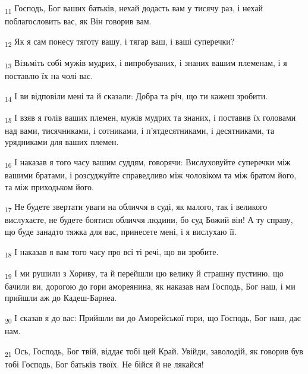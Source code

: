 \begin{tcolorbox}
\textsubscript{11} Господь, Бог ваших батьків, нехай додасть вам у тисячу раз, і нехай поблагословить вас, як Він говорив вам.
\end{tcolorbox}
\begin{tcolorbox}
\textsubscript{12} Як я сам понесу тяготу вашу, і тягар ваш, і ваші суперечки?
\end{tcolorbox}
\begin{tcolorbox}
\textsubscript{13} Візьміть собі мужів мудрих, і випробуваних, і знаних вашим племенам, і я поставлю їх на чолі вас.
\end{tcolorbox}
\begin{tcolorbox}
\textsubscript{14} І ви відповіли мені та й сказали: Добра та річ, що ти кажеш зробити.
\end{tcolorbox}
\begin{tcolorbox}
\textsubscript{15} І взяв я голів ваших племен, мужів мудрих та знаних, і поставив їх головами над вами, тисячниками, і сотниками, і п'ятдесятниками, і десятниками, та урядниками для ваших племен.
\end{tcolorbox}
\begin{tcolorbox}
\textsubscript{16} І наказав я того часу вашим суддям, говорячи: Вислуховуйте суперечки між вашими братами, і розсуджуйте справедливо між чоловіком та між братом його, та між приходьком його.
\end{tcolorbox}
\begin{tcolorbox}
\textsubscript{17} Не будете звертати уваги на обличчя в суді, як малого, так і великого вислухаєте, не будете боятися обличчя людини, бо суд Божий він! А ту справу, що буде занадто тяжка для вас, принесете мені, і я вислухаю її.
\end{tcolorbox}
\begin{tcolorbox}
\textsubscript{18} І наказав я вам того часу про всі ті речі, що ви зробите.
\end{tcolorbox}
\begin{tcolorbox}
\textsubscript{19} І ми рушили з Хориву, та й перейшли цю велику й страшну пустиню, що бачили ви, дорогою до гори амореянина, як наказав нам Господь, Бог наш, і ми прийшли аж до Кадеш-Барнеа.
\end{tcolorbox}
\begin{tcolorbox}
\textsubscript{20} І сказав я до вас: Прийшли ви до Аморейської гори, що Господь, Бог наш, дає нам.
\end{tcolorbox}
\begin{tcolorbox}
\textsubscript{21} Ось, Господь, Бог твій, віддає тобі цей Край. Увійди, заволодій, як говорив був тобі Господь, Бог батьків твоїх. Не бійся й не лякайся!
\end{tcolorbox}
